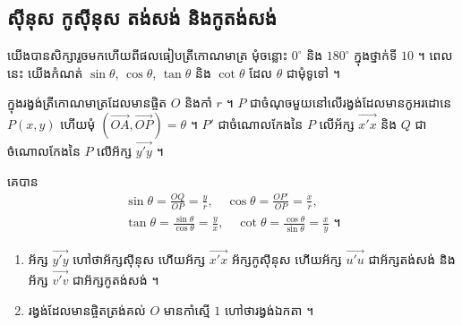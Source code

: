 \subsection{ស៊ីនុស កូស៊ីនុស តង់សង់ និងកូតង់សង់}

យើងបានសិក្សារួចមកហើយពីផលធៀបត្រីកោណមាត្រ មុំចន្លោះ $0^\circ$ និង $180^\circ$ ក្នុងថ្នាក់ទី $10$ ។ ពេលនេះ យើងកំណត់ $\sin\theta$, $\cos\theta$, $\tan\theta$ និង $\cot\theta$ ដែល $\theta$ ជាមុំទូទៅ ។

ក្នុងរង្វង់ត្រីកោណមាត្រដែលមានផ្ចិត $O$ និងកាំ $r$ ។ $P$ ជាចំណុចមួយនៅលើរង្វង់ដែលមានកូអរដោនេ $P(x, y)$ ហើយមុំ $(\overrightarrow{OA}, \overrightarrow{OP}) = \theta$ ។ $P'$ ជាចំណោលកែងនៃ $P$ លើអ័ក្ស $\overrightarrow{x'x}$ និង $Q$ ជាចំណោលកែងនៃ $P$ លើអ័ក្ស $\overrightarrow{y'y}$ ។
\begin{center}
\end{center}
គេបាន
\[
\begin{gathered}
\sin\theta = \frac{OQ}{OP} = \frac{y}{r}, \quad \cos\theta = \frac{OP'}{OP} = \frac{x}{r},\\
\tan\theta = \frac{\sin\theta}{\cos\theta} = \frac{y}{x}, \quad \cot\theta = \frac{\cos\theta}{\sin\theta} = \frac{x}{y} \text{ ។}
\end{gathered}
\]

\begin{note}[សម្គាល់]
\begin{enumerate}[1]
  \item អ័ក្ស $\overrightarrow{y'y}$ ហៅថាអ័ក្សស៊ីនុស ហើយអ័ក្ស $\overrightarrow{x'x}$ អ័ក្សកូស៊ីនុស ហើយអ័ក្ស $\overrightarrow{u'u}$ ជាអ័ក្សតង់សង់ និងអ័ក្ស $\overrightarrow{v'v}$ ជាអ័ក្សកូតង់សង់ ។
  \item រង្វង់ដែលមានផ្ចិតត្រង់គល់ $O$ មានកាំស្មើ $1$ ហៅថារង្វង់ឯកតា ។
\end{enumerate}
\end{note}

